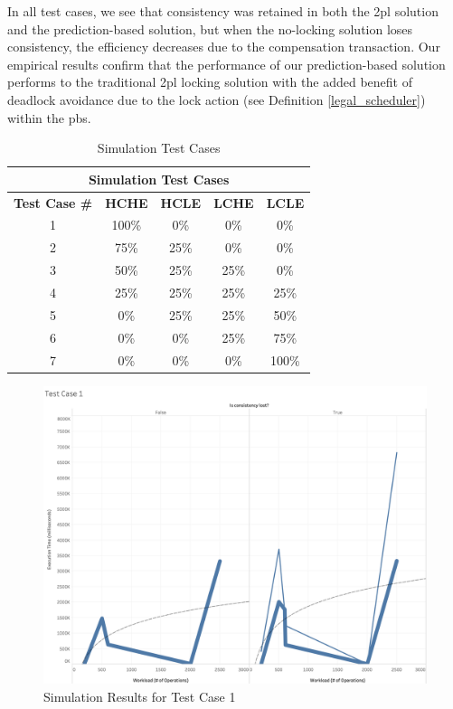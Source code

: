 In all test cases, we see that consistency was retained in both the \gls{2pl} solution and the prediction-based solution, but when the no-locking solution loses consistency, the efficiency decreases due to the compensation transaction. Our empirical results confirm that the performance of our prediction-based solution performs to the traditional \gls{2pl} locking solution with the added benefit of deadlock avoidance due to the lock action (see Definition \ref{legal_scheduler}) within the \gls{pbs}.

\begin{table}[h]
\captionsetup{justification=centering}
\centering
\begin{tabular}{|c|c|c|c|c|}
\hline
\multicolumn{5}{|c|}{\cellcolor[HTML]{EFEFEF}\textbf{Simulation Test Cases}}                                                   \\ \hline
\textbf{Test Case \#} & \textbf{HCHE} & \textbf{HCLE} & \textbf{LCHE} & \textbf{LCLE} \\ \hline
1 & 100\% & 0\% & 0\% & 0\% \\ \hline
2 & 75\% & 25\% & 0\% & 0\% \\ \hline
3 & 50\% & 25\% & 25\% & 0\% \\ \hline
4 & 25\% & 25\% & 25\% & 25\% \\ \hline
5 & 0\% & 25\% & 25\% & 50\% \\ \hline
6 & 0\% & 0\% & 25\% & 75\% \\ \hline
7 & 0\% & 0\% & 0\% & 100\% \\ \hline
\end{tabular}

\caption{Simulation Test Cases} %
\label{tbl:sim_test_cases} %

\end{table}

\begin{figure}
\centering
\includegraphics[scale=0.23]{images/TestCase1(WL).png}
\caption{Simulation Results for Test Case 1}
\label{results:test_case_graphs_1}
\end{figure}

